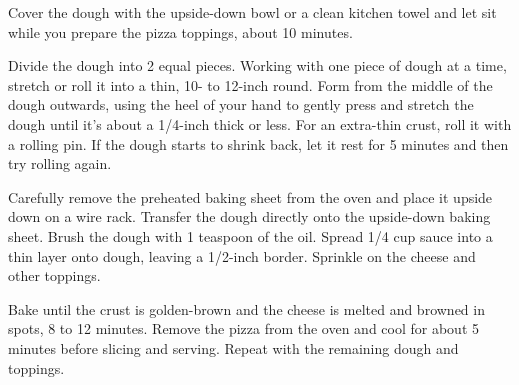 \begin{recipe}
	Cover the dough with the upside-down bowl or a clean kitchen towel and let sit while you prepare the pizza toppings, about 10 minutes.

	Divide the dough into 2 equal pieces. Working with one piece of dough at a time, stretch or roll it into a thin, 10- to 12-inch round. Form from the middle of the dough outwards, using the heel of your hand to gently press and stretch the dough until it's about a 1/4-inch thick or less. For an extra-thin crust, roll it with a rolling pin. If the dough starts to shrink back, let it rest for 5 minutes and then try rolling again.

	Carefully remove the preheated baking sheet from the oven and place it upside down on a wire rack. Transfer the dough directly onto the upside-down baking sheet. Brush the dough with 1 teaspoon of the oil. Spread 1/4 cup sauce into a thin layer onto dough, leaving a 1/2-inch border. Sprinkle on the cheese and other toppings.

	Bake until the crust is golden-brown and the cheese is melted and browned in spots, 8 to 12 minutes. Remove the pizza from the oven and cool for about 5 minutes before slicing and serving. Repeat with the remaining dough and toppings.



\end{recipe}
